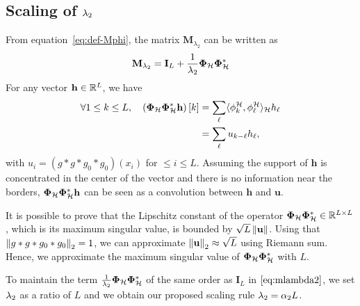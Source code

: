     \subsection{Scaling of \texorpdfstring{$\lambda_{2}$}{lambda 2}}
    From equation~\eqref{eq:def-Mphi}, the matrix $\mathbf{M}_{\lambda_2}$ can be written as
    \begin{equation}
        \label{eq:mlambda2}
        \mathbf{M}_{\lambda_{2}} = \mathbf{I}_L +  \frac{1}{\lambda_{2}}\bm{\Phi}_\mathcal{H}\bm{\Phi}_\mathcal{H}^*
    \end{equation}
    For any vector $\mathbf{h} \in \mathbb{R}^L$, we have
    \begin{align*}
        \forall 1 \leq k \leq L, \quad \left(\bm{\Phi}_\mathcal{H}\bm{\Phi}_\mathcal{H}^*\mathbf{h}\right)[k] &= \sum_\ell \langle \phi^\mathcal{H}_k , \phi^\mathcal{H}_\ell \rangle_{\mathcal{H}} h_\ell \\
            &= \sum_\ell u_{k - \ell} h_\ell,
    \end{align*}
    with $u_i = (g * g * g_0 * g_0)(x_i)$ for $ \leq i \leq L$. Assuming the support of $\mathbf{h}$ is concentrated in the center of the vector and there is no information near the borders, $\bm{\Phi}_\mathcal{H}\bm{\Phi}_\mathcal{H}^*\mathbf{h}$ can be seen as a convolution between $\mathbf{h}$ and $\mathbf{u}$.

    It is possible to prove that the Lipschitz constant of the operator $\bm{\Phi}_\mathcal{H}\bm{\Phi}_\mathcal{H}^* \in \mathbb{R}^{L \times L}$, which is its maximum singular value, is bounded by $\sqrt{L} \left\lVert\mathbf{u}\right\rVert$. Using that $\left\lVert g*g*g_0*g_0\right\rVert_2 = 1$, we can approximate $\left\lVert\mathbf{u}\right\rVert_2 \approx \sqrt{L}$ using Riemann sum. Hence, we approximate the maximum singular value of $\bm{\Phi}_\mathcal{H}\bm{\Phi}_\mathcal{H}^*$ with $L$.

    To maintain the term $\frac{1}{\lambda_{2}} \bm{\Phi}_\mathcal{H}\bm{\Phi}_\mathcal{H}^*$ of the same order as $\mathbf{I}_L$ in $\eqref{eq:mlambda2}$, we set $\lambda_{2}$ as a ratio of $L$ and we obtain our proposed scaling rule $\lambda_{2} = \alpha_2 L$.
    
\clearpage




        
